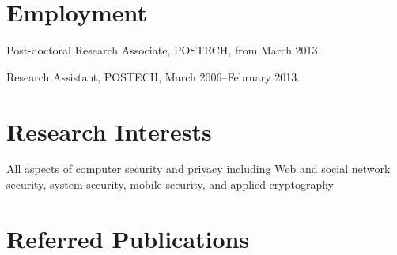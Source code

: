 \documentclass[letterpaper]{article}
\renewenvironment{itemize}{
  \begin{list}{}{
    \setlength{\leftmargin}{1.5em}
  }
}{
  \end{list}
}
\begin{document}
\section*{Employment}
\begin{itemize}
  \item Post-doctoral Research Associate, POSTECH, from March 2013.
  \item Research Assistant, POSTECH, March 2006--February 2013.
\end{itemize}

\section*{Research Interests}
All aspects of computer security and privacy including Web and social network security, system security, mobile security, and applied cryptography

\section*{Referred Publications}
\end{document}
